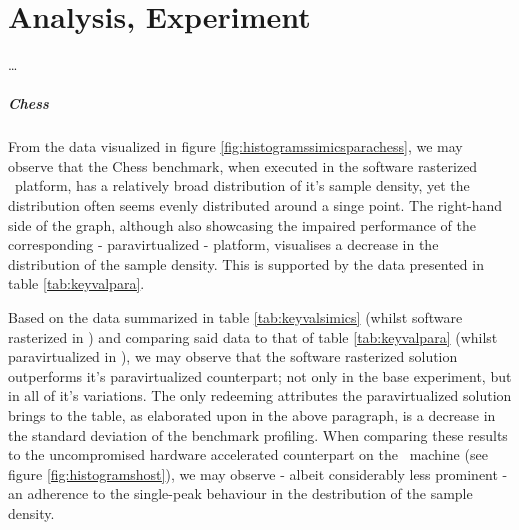 

\chapter{Analysis, Experiment}
\label{cha:analysisexperiment}
\ldots



\paragraph{Chess}
\label{par:analysisexperiment_chess}
From the data visualized in figure \ref{fig:histogramssimicsparachess}, we may observe that the Chess benchmark, when executed in the software rasterized \dvttermsimics\ platform, has a relatively broad distribution of it's sample density, yet the distribution often seems evenly distributed around a singe point.
The right-hand side of the graph, although also showcasing the impaired performance of the corresponding - paravirtualized - platform, visualises a decrease in the distribution of the sample density.
This is supported by the data presented in table \ref{tab:keyvalpara}.

Based on the data summarized in table \ref{tab:keyvalsimics} (whilst software rasterized in \dvttermsimics ) and comparing said data to that of table \ref{tab:keyvalpara} (whilst paravirtualized in \dvttermsimics ), we may observe that the software rasterized solution outperforms it's paravirtualized counterpart; not only in the base experiment, but in all of it's variations.
The only redeeming attributes the paravirtualized solution brings to the table, as elaborated upon in the above paragraph, is a decrease in the standard deviation of the benchmark profiling.
When comparing these results to the uncompromised hardware accelerated counterpart on the \dvttermhost\ machine (see figure \ref{fig:histogramshost}), we may observe - albeit considerably less prominent - an adherence to the single-peak behaviour in the destribution of the sample density.

